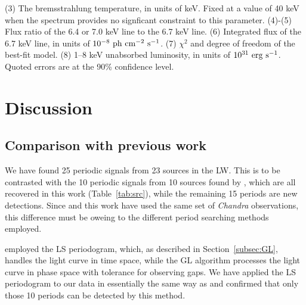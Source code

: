 \documentclass[fleqn,usenatbib]{mnras}
\begin{document}
\begin{table}
\begin{threeparttable}
\begin{tablenotes}
(3) The bremsstrahlung temperature, in units of keV. Fixed at a value of 40 keV when the spectrum provides no signficant constraint to this parameter.
 (4)-(5) Flux ratio of the 6.4 or 7.0 keV line to the 6.7 keV line.
 (6) Integrated flux of the 6.7 keV line, in units of $10^{-8}\rm~ph~cm^{-2}~s^{-1}$.
 (7) $\chi^2$ and degree of freedom of the best-fit model.
 (8) 1--8 keV unabsorbed luminosity, in units of $10^{31}\rm~erg~s^{-1}$. Quoted errors are at the 90\% confidence level.
\end{tablenotes} 
\end{threeparttable}
\end{table} 
 
%


\section{Discussion}\label{sec:discussion}
\subsection{Comparison with previous work} \label{subsec:compare}
We have found 25 periodic signals from 23 sources in the LW. This is to be contrasted with the 10 periodic signals from 10 sources found by  \cite{2012ApJ...746..165H}, which are all recovered in this work (Table~\ref{tab:src}), while the remaining 15 periods are new detections. 
Since \cite{2012ApJ...746..165H} and this work have used the same set of {\it Chandra} observations, 
this difference must be oweing to the different period searching methods employed.

\cite{2012ApJ...746..165H} employed the LS periodogram,
which, as described in Section~\ref{subsec:GL}, handles the light curve in time space, while the GL algorithm processes the light curve in phase space with tolerance for observing gaps. We have applied the LS periodogram to our data in essentially the same way as \cite{2012ApJ...746..165H} and confirmed that only those 10 periods can be detected by this method.
\end{document}
